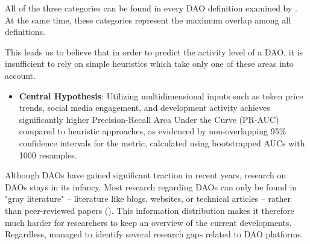 All of the three categories can be found in every DAO definition examined by \textcite{rikken2023ins}. 
At the same time, these categories represent the maximum overlap among all definitions. 

This leads us to believe that in order to predict the activity level of a DAO, it is insufficient to rely on simple heuristics which take only one of these areas into account.
\begin{itemize}
    \item \textbf{Central Hypothesis}: Utilizing multidimensional inputs such as token price trends, social media engagement, and development activity achieves significantly higher Precision-Recall Area Under the Curve (PR-AUC) compared to heuristic approaches, as evidenced by non-overlapping 95\% confidence intervals for the metric, calculated using bootstrapped AUCs with 1000 resamples.
\end{itemize}





















Although DAOs have gained significant traction in recent years, research on DAOs stays in its infancy.
Most research regarding DAOs can only be found in "gray literature" -- literature like blogs, websites, or technical articles -- rather than peer-reviewed papers (\cite{faqir2021comparative}).
This information distribution makes it therefore much harder for researchers to keep an overview of the current developments.
Regardless, \textcite{tan2023open} managed to identify several research gaps related to DAO platforms. 

